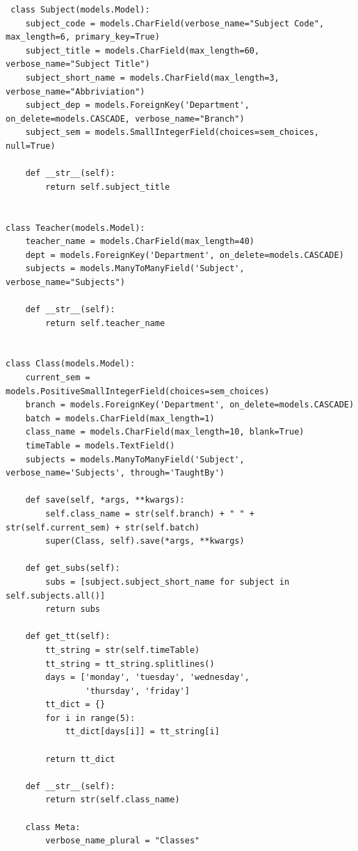 \documentclass{article}
\begin{document}
\begin{lstlisting}
 class Subject(models.Model):
    subject_code = models.CharField(verbose_name="Subject Code", max_length=6, primary_key=True)
    subject_title = models.CharField(max_length=60, verbose_name="Subject Title")
    subject_short_name = models.CharField(max_length=3, verbose_name="Abbriviation")
    subject_dep = models.ForeignKey('Department', on_delete=models.CASCADE, verbose_name="Branch")
    subject_sem = models.SmallIntegerField(choices=sem_choices, null=True)

    def __str__(self):
        return self.subject_title


class Teacher(models.Model):
    teacher_name = models.CharField(max_length=40)
    dept = models.ForeignKey('Department', on_delete=models.CASCADE)
    subjects = models.ManyToManyField('Subject', verbose_name="Subjects")

    def __str__(self):
        return self.teacher_name


class Class(models.Model):
    current_sem = models.PositiveSmallIntegerField(choices=sem_choices)
    branch = models.ForeignKey('Department', on_delete=models.CASCADE)
    batch = models.CharField(max_length=1)
    class_name = models.CharField(max_length=10, blank=True)
    timeTable = models.TextField()
    subjects = models.ManyToManyField('Subject', verbose_name='Subjects', through='TaughtBy')

    def save(self, *args, **kwargs):
        self.class_name = str(self.branch) + " " + str(self.current_sem) + str(self.batch)
        super(Class, self).save(*args, **kwargs)

    def get_subs(self):
        subs = [subject.subject_short_name for subject in self.subjects.all()]
        return subs

    def get_tt(self):
        tt_string = str(self.timeTable)
        tt_string = tt_string.splitlines()
        days = ['monday', 'tuesday', 'wednesday',
                'thursday', 'friday']
        tt_dict = {}
        for i in range(5):
            tt_dict[days[i]] = tt_string[i]

        return tt_dict

    def __str__(self):
        return str(self.class_name)

    class Meta:
        verbose_name_plural = "Classes"
\end{lstlisting}

\end{document}
